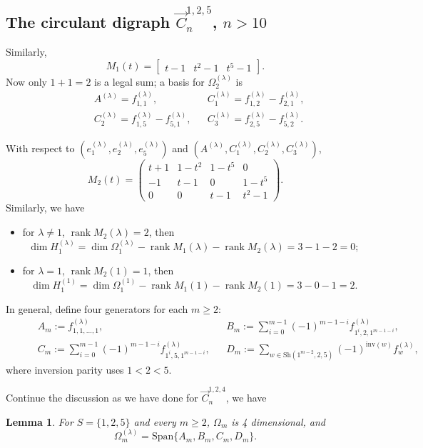 \documentclass[11pt]{amsart}
\newcommand{\rank}{\operatorname{rank}}
\theoremstyle{plain}
\newtheorem{lemma}[theorem]{Lemma}
\theoremstyle{definition}
\numberwithin{equation}{section}
\begin{document}
\subsection{The circulant digraph \texorpdfstring{$\vec{C}_n^{1,2,5}$, $n>10$}{125}}
Similarly,
\[
M_1(t)=\begin{bmatrix} t-1 & t^2-1 & t^5-1\end{bmatrix}.
\]
Now only $1+1=2$ is a legal sum; a basis for $\Omega_2^{(\lambda)}$ is
\begin{align*}
\qquad &A^{(\lambda)}=f_{1,1}^{(\lambda)}, &&
C_1^{(\lambda)}=f_{1,2}^{(\lambda)}-f_{2,1}^{(\lambda)},\\
\qquad &C_2^{(\lambda)}=f_{1,5}^{(\lambda)}-f_{5,1}^{(\lambda)},&&
C_3^{(\lambda)}=f_{2,5}^{(\lambda)}-f_{5,2}^{(\lambda)}.
\end{align*}

\noindent With respect to $(e_1^{(\lambda)},e_2^{(\lambda)},e_5^{(\lambda)})$ and $(A^{(\lambda)},C_1^{(\lambda)},C_2^{(\lambda)},C_3^{(\lambda)})$,
\[
M_2(t)=
\begin{pmatrix}
t+1 & 1-t^2 & 1-t^5 & 0\\
-1 & t-1 & 0 & 1-t^5\\
0 & 0 & t-1 & t^2-1
\end{pmatrix}.
\]
Similarly, we have
\begin{itemize}
    \item for $\lambda\neq 1$, $\rank{M_2(\lambda)}=2$, then
    \[\dim H_1^{(\lambda)}=\dim\Omega_1^{(\lambda)}-\rank M_1(\lambda)-\rank M_2(\lambda)=3-1-2=0;\]
    \item for $\lambda=1$, $\rank{M_2(1)}=1$, then
    \[\dim H_1^{(1)}=\dim\Omega_1^{(1)}-\rank M_1(1)-\rank M_2(1)=3-0-1=2.\]
\end{itemize}





In general, define four generators for each $m\ge 2$:
\begin{align*}
\qquad &A_m := f^{(\lambda)}_{1,1,\dots,1}, &&
B_m := \sum_{i=0}^{m-1} (-1)^{m-1-i}f^{(\lambda)}_{1^i,2,1^{m-1-i}},\\
\qquad &C_m := \sum_{i=0}^{m-1} (-1)^{m-1-i} f^{(\lambda)}_{1^i,5,1^{m-1-i}}, && D_m := \sum_{w\in \mathrm{Sh}(1^{m-2},2,5)} (-1)^{\mathrm{inv}(w)} f^{(\lambda)}_{w},
\end{align*}
where inversion parity uses $1<2<5$.

\vskip 0.1cm
Continue the discussion as we have done for $\vec{C}_n^{1,2,4}$, we have
\begin{lemma}
For $S=\{1,2,5\}$ and every $m\ge 2$, $\Omega_m$ is 4 dimensional, and
\[
\Omega_m^{(\lambda)}=\mathrm{Span}\{A_m,B_m,C_m,D_m\}.
\]
\end{lemma}
\end{document}

